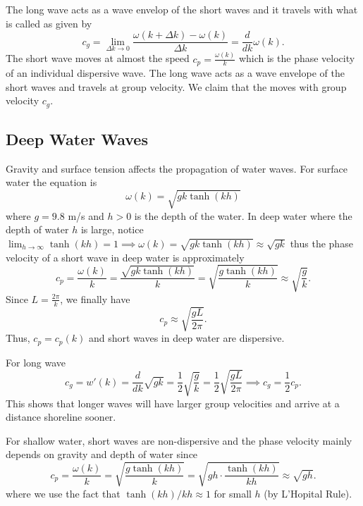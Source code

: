 \documentclass[class=article,crop=false]{standalone}
\begin{document}
The long wave acts as a wave envelop of the short waves and it travels with what is called as  given by
\[
	c_g = \lim_{ \Delta k \to 0} \frac{\omega(k+ \Delta k) - \omega(k)}{\Delta k }= \frac{d}{dk} \omega(k)
.\] 
The short wave moves at almost the speed $ c_p = \frac{\omega(k)}{k }$ which is the phase velocity of an individual dispersive wave. The long wave acts as a wave envelope of the short waves and travels at group velocity. We claim that the   moves with group velocity $ c_g$.

\subsection{Deep Water Waves}

Gravity and surface tension affects the propagation of water waves. For surface water the equation is
\[
	\omega(k) = \sqrt{gk \tanh(kh)} 
\] 
where $ g=9.8$ m/s and  $ h>0$ is the depth of the water. In deep water where the depth of water $ h$ is large, notice $ \lim_{ h \to \infty} \tanh(kh) =1 \implies \omega(k) = \sqrt{gk \tanh(kh)} \approx \sqrt{gk}  $ thus the phase velocity of a short wave in deep water is approximately
\[
	c_p = \frac{\omega(k)}{k } = \frac{\sqrt{gk \tanh(kh)} }{k } = \sqrt{\frac{g \tanh(kh)}{k }}  \approx \sqrt{\frac{g}{k} }
.\]
Since $ L=\frac{2\pi}{k }$, we finally have
\[
c_p \approx \sqrt{\frac{gL}{2\pi }} 
.\] 
Thus, $ c_p=c_p(k)$ and short waves in deep water are dispersive.

For long wave
\[
	c_g = w'(k) = \frac{d}{dk} \sqrt{gk} = \frac{1}{2} \sqrt{\frac{g}{k}} = \frac{1}{2} \sqrt{\frac{gL}{ 2\pi}}  \implies c_g = \frac{1}{2} c_p 
.\] 
This shows that longer waves will have larger group velocities and arrive at a distance shoreline sooner.

For shallow water, short waves are non-dispersive and the phase velocity mainly depends on gravity and depth of water since
\[
	c_p = \frac{\omega(k)}{k } = \sqrt{\frac{g \tanh(kh)}{k }} = \sqrt{gh \cdot \frac{\tanh(kh)}{kh }} \approx \sqrt{gh}   
.\]
where we use the fact that $ \tanh(kh) / kh \approx 1$ for small $ h$ (by L'Hopital Rule).
\end{document}
